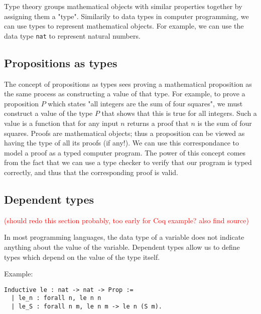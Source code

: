 Type theory groups mathematical objects with similar properties together by assigning them a "type".
Similarily to data types in computer programming, we can use types to represent mathematical
objects. For example, we can use the data type \texttt{nat} to represent natural numbers.

\subsection{Propositions as types}


The concept of propositions as types sees proving a mathematical proposition
as the same process as constructing a value of that type.
For example, to prove a proposition $P$ which states "all integers are the sum of four squares",
we must construct a value of the type $P$ that shows that this is true for all integers.
Such a value is a function that for any input $n$ returns a proof that $n$ is the sum of four squares.
Proofs are mathematical objects; thus a proposition can be viewed as having the type of all its proofs (if any!).
We can use this correspondance to model a proof as a typed computer program.
The power of this concept comes from the fact that we can use a type checker to verify that
our program is typed correctly, and thus that the corresponding proof is valid.

\subsection{Dependent types}

\textcolor{red}{(should redo this section probably, too early for Coq example? also find source)}

In most programming languages, the data type of a variable does not indicate anything about the value of the variable.
Dependent types allow us to define types which depend on the value of the type itself.

Example:

\begin{minipage}{\linewidth}
\begin{lstlisting}[language=Coq, label={lst:dep_type_le}, caption={Def. of \lstinline{le} in Coq, using dependent types}]
Inductive le : nat -> nat -> Prop :=
  | le_n : forall n, le n n
  | le_S : forall n m, le n m -> le n (S m).
\end{lstlisting}
\end{minipage}

